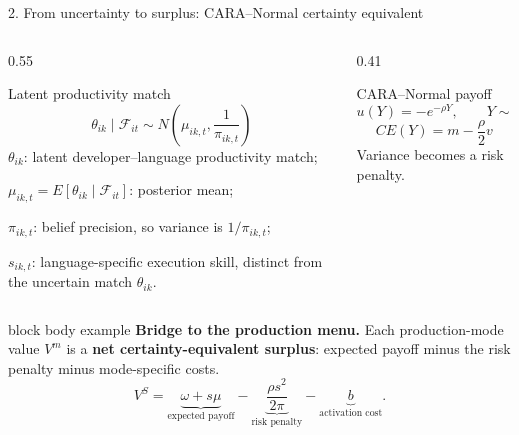 \documentclass[aspectratio=169,10pt]{beamer}
\begin{document}
\begin{frame}{2. From uncertainty to surplus: CARA--Normal certainty equivalent}
  \vspace{-0.08cm}
  \begin{columns}[T,onlytextwidth]
    \begin{column}{0.55\textwidth}
      \begin{block}{Latent productivity match}
        \vspace{-0.08cm}
        \[
          \theta_{ik}\mid\mathcal F_{it}
          \sim
          N\!\left(\mu_{ik,t},\frac{1}{\pi_{ik,t}}\right)
        \]
        \vspace{-0.10cm}
        \scriptsize
        $\theta_{ik}$: latent developer--language productivity match;\par
        $\mu_{ik,t}=E[\theta_{ik}\mid\mathcal F_{it}]$: posterior mean;\par
        $\pi_{ik,t}$: belief precision, so variance is $1/\pi_{ik,t}$;\par
        $s_{ik,t}$: language-specific execution skill, distinct from the uncertain match $\theta_{ik}$.
      \end{block}
    \end{column}
    \begin{column}{0.41\textwidth}
      \begin{block}{CARA--Normal payoff}
        \[
          u(Y)=-e^{-\rho Y},
          \qquad
          Y\sim N(m,v).
        \]
        \vspace{-0.08cm}
        \[
          \boxed{CE(Y)=m-\frac{\rho}{2}v}
        \]
        \scriptsize Variance becomes a risk penalty.
      \end{block}
    \end{column}
  \end{columns}

  \vspace{-0.04cm}
  \begin{beamercolorbox}[wd=\textwidth,sep=0.15cm,rounded=true]{block body example}
    \small\textbf{Bridge to the production menu.} Each production-mode value $V^m$ is a \textbf{net certainty-equivalent surplus}: expected payoff minus the risk penalty minus mode-specific costs.
    \vspace{-0.06cm}
    \[
      V^S
      =\underbrace{\omega+s\mu}_{\text{expected payoff}}
      -\underbrace{\frac{\rho s^2}{2\pi}}_{\text{risk penalty}}
      -\underbrace{b}_{\text{activation cost}}.
    \]
    \vspace{-0.10cm}
  \end{beamercolorbox}
\end{frame}
\end{document}
